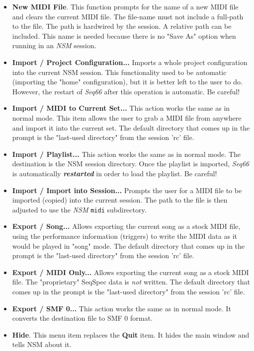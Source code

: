    \begin{itemize}
      \item \textbf{New MIDI File}.
         This function prompts for the name of a
         new MIDI file and clears the current MIDI file.  The file-name must not
         include a full-path to the file.  The path is hardwired by the
         session.  A relative path can be included.  This name is needed
         because there is no "Save As" option when running in an \textsl{NSM}
         session.
      \item \textbf{Import / Project Configuration...}
         Imports a whole project configuration into the current NSM session.
         This functionality used to be automatic (importing the "home"
         configuration), but it is better left to the user to do.
         However, the restart of \textsl{Seq66} after this operation is
         automatic.  Be careful!
      \item \textbf{Import / MIDI to Current Set...}
         This action works the same as in normal mode.
         This item allows the user to grab a MIDI file from anywhere and import
         it into the current set.
         The default directory that comes up in the
         prompt is the "last-used directory" from the session 'rc' file.
      \item \textbf{Import / Playlist...}
         This action works the same as in normal mode.
         The destination is the NSM session directory.
         Once the playlist is imported,
         \textsl{Seq66} is automatically \textsl{\textbf{restarted}}
         in order to load the playlist.
         Be careful!
      \item \textbf{Import / Import into Session...}
         Prompts the user for a MIDI file to
         be imported (copied) into the current session.  The path to the file
         is then adjusted to use the \textsl{NSM} \texttt{midi} subdirectory.
      \item \textbf{Export / Song...}
         Allows exporting the current song as a stock MIDI file, using the
         performance information (triggers) to write the MIDI data as it would
         be played in "song" mode.
         The default directory that comes up in the
         prompt is the "last-used directory" from the session 'rc' file.
      \item \textbf{Export / MIDI Only...}
         Allows exporting the current song as a stock MIDI file.
         The "proprietary" SeqSpec data is \textsl{not} written.
         The default directory that comes up in the
         prompt is the "last-used directory" from the session 'rc' file.
      \item \textbf{Export / SMF 0...}
         This action works the same as in normal mode.
         It converts the destination file to SMF 0 format.
      \item \textbf{Hide}.
         This menu item replaces the \textbf{Quit} item.
         It hides the main window and tells NSM about it.
   \end{itemize}

